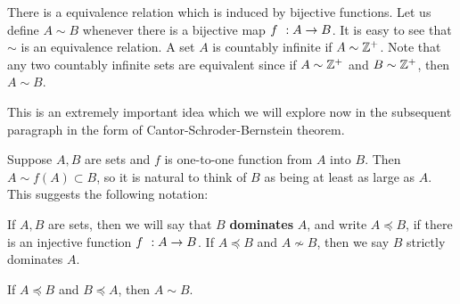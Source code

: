 There is a equivalence relation which is induced by bijective functions.
Let us define $A\sim B$ whenever there is a bijective map ${f}\hspace{0.05in}:{A}\to{B}$. It is easy to see that $\sim$ is an
equivalence relation. A set $A$ is countably infinite if $A \sim \mathbb{Z}^{+}$. Note that any two countably infinite
sets are equivalent since if $A\sim \mathbb{Z}^{+}$ and $B \sim \mathbb{Z}^{+}$, then $A \sim B$. 

This is an extremely
important idea which we will explore now in the subsequent paragraph in the form of Cantor-Schroder-Bernstein
theorem.

Suppose $A,B$ are sets and $f$ is one-to-one function from $A$ into $B$. Then $A\sim f(A)\subset B$, so it is
natural to think of $B$ as being at least as large as $A$. This suggests the following notation:
\begin{Definition}
    If $A,B$ are sets, then we will say that $B$ \textbf{dominates} $A$, and write $A \preceq B$, if there is
    an injective function ${f}\hspace{0.05in}:{A}\to{B}$. If $A\preceq B$ and $A\not\sim B$, then we say $B$ strictly
    dominates $A$.
\end{Definition}
\begin{Theorem}[name=Schroder-Bernstein theorem]
    If $A \preceq B$ and $B \preceq A$, then $A\sim B$.
\end{Theorem}
